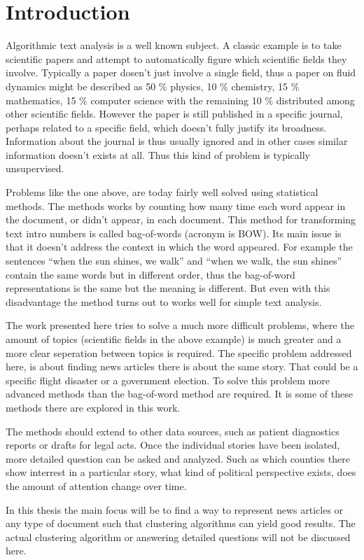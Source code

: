 \chapter{Introduction}

Algorithmic text analysis is a well known subject.
A classic example is to take scientific papers and attempt to automatically figure which scientific fields they involve.
Typically a paper dosen't just involve a single field, thus a paper on fluid dynamics might be described as 50 \% physics, 10 \% chemistry, 15 \% mathematics, 15 \% computer science with the remaining 10 \% distributed among other scientific fields.
However the paper is still published in a specific journal, perhaps related to a specific field, which doesn't fully justify its broadness.
Information about the journal is thus usually ignored and in other cases similar information doesn't exists at all. Thus this kind of problem is typically unsupervised.

Problems like the one above, are today fairly well solved\cite{missing source} using statistical methods.
The methods works by counting how many time each word appear in the document, or didn't appear, in each document.
This method for transforming text intro numbers is called bag-of-words (acronym is BOW).
Its main issue is that it doesn't address the context in which the word appeared.
For example the sentences ``when the sun shines, we walk'' and ``when we walk, the sun shines'' contain the same words but in different order, thus the bag-of-word representations is the same but the meaning is different.
But even with this disadvantage the method turns out to works well for simple text analysis.

The work presented here tries to solve a much more difficult problems, where the amount of topics (scientific fields in the above example) is much greater and a more clear seperation between topics is required.
The specific problem addressed here, is about finding news articles there is about the same story.
That could be a specific flight disaster or a government election.
To solve this problem more advanced methods than the bag-of-word method are required.
It is some of these methods there are explored in this work.

The methods should extend to other data sources, such as patient diagnostics reports or drafts for legal acts.
Once the individual stories have been isolated, more detailed question can be asked and analyzed. Such as which counties there show interrest in a particular story, what kind of political perspective exists, does the amount of attention change over time.

In this thesis the main focus will be to find a way to represent news articles or any type of document such that clustering algorithms can yield good results. The actual clustering algorithm or answering detailed questions will not be discussed here.
